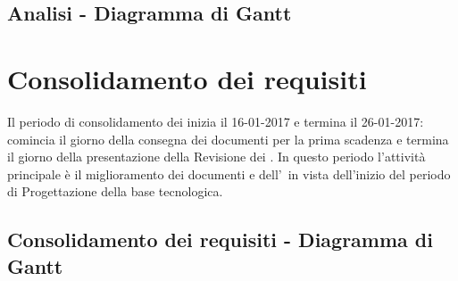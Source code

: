 \documentclass[PianoDiProgetto.tex]{subfiles}
\begin{document}
\begin{landscape}
\subsection{Analisi - Diagramma di Gantt}
\end{landscape}	
\section{Consolidamento dei requisiti}
Il periodo di consolidamento dei  inizia il 16-01-2017 e termina il 26-01-2017: comincia il giorno della consegna dei documenti per la prima scadenza e termina il giorno della presentazione della Revisione dei . In questo periodo l'attività principale è il miglioramento dei documenti e dell'\adr\ in vista dell'inizio del periodo di Progettazione della base tecnologica.
\subsection{Consolidamento dei requisiti - Diagramma di Gantt}

\newpage
\end{document}
